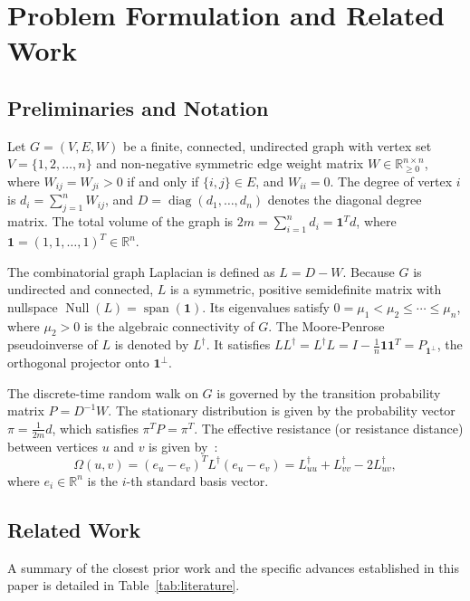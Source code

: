 \documentclass[11pt,a4paper]{article}
\theoremstyle{plain}
\theoremstyle{definition}
\begin{document}
\section{Problem Formulation and Related Work}
\label{sec:formulation}

\subsection{Preliminaries and Notation}
Let $G = (V, E, W)$ be a finite, connected, undirected graph with vertex set $V = \{1, 2, \dots, n\}$ and non-negative symmetric edge weight matrix $W \in \mathbb{R}^{n \times n}_{\ge 0}$, where $W_{ij} = W_{ji} > 0$ if and only if $\{i, j\} \in E$, and $W_{ii} = 0$. The degree of vertex $i$ is $d_i = \sum_{j=1}^n W_{ij}$, and $D = \operatorname{diag}(d_1, \dots, d_n)$ denotes the diagonal degree matrix. The total volume of the graph is $2m = \sum_{i=1}^n d_i = \mathbf{1}^T d$, where $\mathbf{1} = (1, 1, \dots, 1)^T \in \mathbb{R}^n$.

The combinatorial graph Laplacian is defined as $L = D - W$. Because $G$ is undirected and connected, $L$ is a symmetric, positive semidefinite matrix with nullspace $\operatorname{Null}(L) = \operatorname{span}(\mathbf{1})$. Its eigenvalues satisfy $0 = \mu_1 < \mu_2 \le \cdots \le \mu_n$, where $\mu_2 > 0$ is the algebraic connectivity of $G$. The Moore-Penrose pseudoinverse of $L$ is denoted by $L^\dagger$. It satisfies $L L^\dagger = L^\dagger L = I - \frac{1}{n} \mathbf{1} \mathbf{1}^T = P_{\mathbf{1}^\perp}$, the orthogonal projector onto $\mathbf{1}^\perp$.

The discrete-time random walk on $G$ is governed by the transition probability matrix $P = D^{-1} W$. The stationary distribution is given by the probability vector $\pi = \frac{1}{2m} d$, which satisfies $\pi^T P = \pi^T$. The effective resistance (or resistance distance) between vertices $u$ and $v$ is given by~\cite{klein1993resistance}:
\begin{equation}
    \Omega(u, v) = (e_u - e_v)^T L^\dagger (e_u - e_v) = L^\dagger_{uu} + L^\dagger_{vv} - 2 L^\dagger_{uv},
\end{equation}
where $e_i \in \mathbb{R}^n$ is the $i$-th standard basis vector.

\subsection{Related Work}
A summary of the closest prior work and the specific advances established in this paper is detailed in Table~\ref{tab:literature}.
\end{document}
